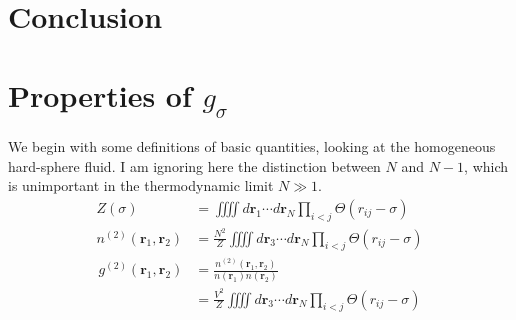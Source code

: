 \documentclass[letterpaper,twocolumn,amsmath,amssymb,pre,aps,10pt]{revtex4-1}
\newcommand{\rr}{\textbf{r}}
\begin{document}
\section{Conclusion}


\appendix

\section{Properties of $g_\sigma$}
We begin with some definitions of basic quantities, looking at the
homogeneous hard-sphere fluid.  I am ignoring here the distinction
between $N$ and $N-1$, which is unimportant in the thermodynamic limit
$N\gg 1$.
\begin{align}
  Z(\sigma) &= \iiiint d\rr_1\cdots d\rr_N \prod_{i<j} \Theta(r_{ij}-\sigma)
  \\
  n^{(2)}(\rr_1,\rr_2) &= \frac{N^2}{Z}\iiiint d\rr_3\cdots d\rr_N \prod_{i<j} \Theta(r_{ij}-\sigma)
\end{align}
\begin{align}
  g^{(2)}(\rr_1,\rr_2) &=
  \frac{n^{(2)}(\rr_1,\rr_2)}{n(\rr_1)n(\rr_2)}
  \\
  &= \frac{V^2}{Z}\iiiint d\rr_3\cdots d\rr_N \prod_{i<j}
  \Theta(r_{ij}-\sigma)
  \label{eq:g2-integral-defn}
\end{align}
\end{document}
